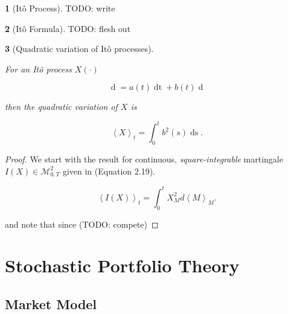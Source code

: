 \documentclass[british]{amsart}
\numberwithin{equation}{section}
\numberwithin{figure}{section}
\theoremstyle{plain}
\newtheorem{thm}{\protect\theoremname}[section]
\theoremstyle{definition}
\newtheorem{defn}[thm]{\protect\definitionname}
\theoremstyle{plain}
\theoremstyle{plain}
\theoremstyle{plain}
\theoremstyle{remark}
\theoremstyle{plain}
\providecommand{\definitionname}{Definition}
\providecommand{\theoremname}{Theorem}
\renewcommand{\d}[1]{\mathop{\mathrm{d}{#1}}}
\newcommand{\msquared}{\mathcal{M}^{2}_{0,T}}
\newcommand{\filtration}[1]{\mathcal{F_{#1}}}
\begin{document}
\begin{defn} [It\^{o} Process]
	\label{def:itoprocess}
	TODO: write
\end{defn}

\begin{defn} [It\^{o} Formula]
	\label{def:itoformula}
	TODO: flesh out
\end{defn}

\begin{thm} [Quadratic variation of It\^{o} processes]
	\label{thm:quadraticvariationofitoprocess}

	For an It\^{o} process $X(\cdot)$ 
	
	\begin{equation*}
		\d{X(t)} = a(t)\d{t} + b(t)\d{W(t)}
	\end{equation*}
	
	then the quadratic variation of $X$ is
	
	\begin{equation*}
		\left< X \right>_{t} = \int_{0}^{t} b^2(s)\d{s}.
	\end{equation*}

\end{thm}

\begin{proof}
	We start with the result for continuous, \textit{square-integrable} martingale 
	$I(X) \in \msquared$ given in \cite{shreve2012} (Equation 2.19).

	\begin{equation*}
		\left<I(X)\right>_{t} = \int_{0}^{t} X_{M}^2 d\left<M\right>_{M}.
	\end{equation*}

	and note that since (TODO: compete)
\end{proof}


\newcommand{\abs}[1]{\mathop{|{#1}|}}
\newcommand{\market}{\mathcal{M}}
\newcommand{\rangei}{i=1,\dots,n}
\newcommand{\measure}{\mathbb{P}}
\newcommand{\probabilityspace}{(\Omega,\filtration,\measure)}

\section{Stochastic Portfolio Theory}

\subsection{Market Model}
\end{document}
